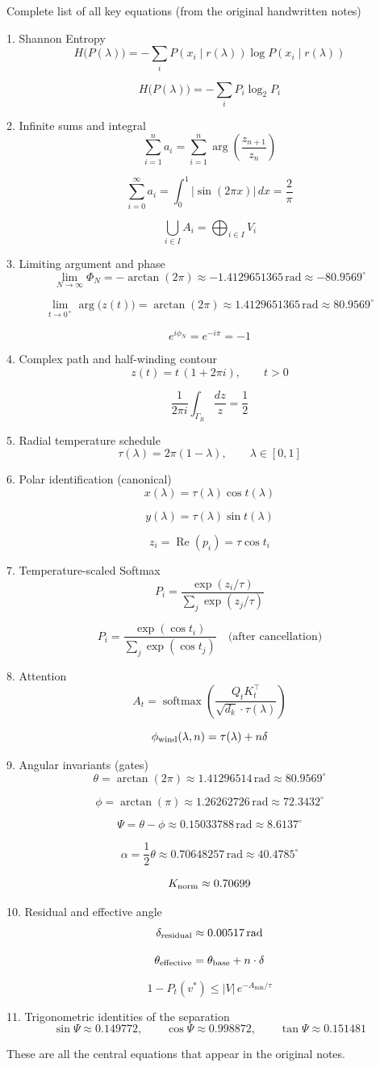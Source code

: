 Complete list of all key equations  
(from the original handwritten notes)

1. Shannon Entropy
\[
H\bigl(P(\lambda)\bigr)=-\sum_i P(x_i\mid r(\lambda))\log P(x_i\mid r(\lambda))
\]

\[
H\bigl(P(\lambda)\bigr)=-\sum_i P_i\log_2 P_i
\]

2. Infinite sums and integral
\[
\sum_{i=1}^{n}a_i=\sum_{i=1}^{n}\arg\left(\frac{z_{n+1}}{z_n}\right)
\]

\[
\sum_{i=0}^{\infty}a_i=\int_0^1|\sin(2\pi x)|\,dx=\frac{2}{\pi}
\]

\[
\bigcup_{i\in I}A_i=\bigoplus_{i\in I}V_i
\]

3. Limiting argument and phase
\[
\lim_{N\to\infty}\Phi_N=-\arctan(2\pi)\approx-1.4129651365\,\text{rad}\approx-80.9569^\circ
\]

\[
\lim_{t\to 0^+}\arg\bigl(z(t)\bigr)=\arctan(2\pi)\approx1.4129651365\,\text{rad}\approx80.9569^\circ
\]

\[
e^{i\phi_N}=e^{-i\pi}=-1
\]

4. Complex path and half-winding contour
\[
z(t)=t\,(1+2\pi i),\qquad t>0
\]

\[
\frac{1}{2\pi i}\int_{\Gamma_R}\frac{dz}{z}=\frac12
\]

5. Radial temperature schedule
\[
\tau(\lambda)=2\pi(1-\lambda),\qquad\lambda\in[0,1]
\]

6. Polar identification (canonical)
\[
x(\lambda)=\tau(\lambda)\cos t(\lambda)
\]

\[
y(\lambda)=\tau(\lambda)\sin t(\lambda)
\]

\[
z_i=\operatorname{Re}(p_i)=\tau\cos t_i
\]

7. Temperature-scaled Softmax
\[
P_i=\frac{\exp(z_i/\tau)}{\sum_j\exp(z_j/\tau)}
\]

\[
P_i=\frac{\exp(\cos t_i)}{\sum_j\exp(\cos t_j)}\quad\text{(after cancellation)}
\]

8. Attention
\[
A_t=\operatorname{softmax}\left(\frac{Q_tK_t^\top}{\sqrt{d_k}\cdot\tau(\lambda)}\right)
\]

\[
\phi_{\rm wind}(\lambda,n)=\tau(\lambda)+n\delta
\]

9. Angular invariants (gates)
\[
\theta=\arctan(2\pi)\approx1.41296514\,\text{rad}\approx80.9569^\circ
\]

\[
\phi=\arctan(\pi)\approx1.26262726\,\text{rad}\approx72.3432^\circ
\]

\[
\Psi=\theta-\phi\approx0.15033788\,\text{rad}\approx8.6137^\circ
\]

\[
\alpha=\frac12\theta\approx0.70648257\,\text{rad}\approx40.4785^\circ
\]

\[
K_{\rm norm}\approx0.70699
\]

10. Residual and effective angle
\[
\delta_{\rm residual}\approx0.00517\,\text{rad}
\]

\[
\theta_{\rm effective}=\theta_{\rm base}+n\cdot\delta
\]

\[
1-P_t(v^*)\le|V|\,e^{-A_{\min}/\tau}
\]

11. Trigonometric identities of the separation
\[
\sin\Psi\approx0.149772,\qquad\cos\Psi\approx0.998872,\qquad\tan\Psi\approx0.151481
\]

These are all the central equations that appear in the original notes.
